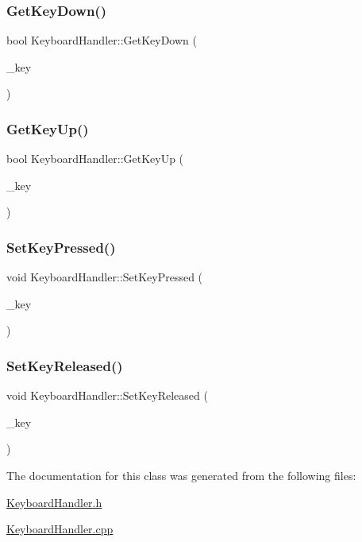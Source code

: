 \subsubsection{\texorpdfstring{Get\+Key\+Down()}{GetKeyDown()}}
{\footnotesize\ttfamily bool Keyboard\+Handler\+::\+Get\+Key\+Down (\begin{DoxyParamCaption}\item[{std\+::string}]{\+\_\+key }\end{DoxyParamCaption})}

\mbox{\label{class_keyboard_handler_ad184d06a6bf5d2d1db362e79a8073d98}} 
\subsubsection{\texorpdfstring{Get\+Key\+Up()}{GetKeyUp()}}
{\footnotesize\ttfamily bool Keyboard\+Handler\+::\+Get\+Key\+Up (\begin{DoxyParamCaption}\item[{std\+::string}]{\+\_\+key }\end{DoxyParamCaption})}

\mbox{\label{class_keyboard_handler_a166c8d62ec7c01cb155e7ba47007501a}} 
\subsubsection{\texorpdfstring{Set\+Key\+Pressed()}{SetKeyPressed()}}
{\footnotesize\ttfamily void Keyboard\+Handler\+::\+Set\+Key\+Pressed (\begin{DoxyParamCaption}\item[{S\+D\+L\+\_\+\+Keycode}]{\+\_\+key }\end{DoxyParamCaption})}

\mbox{\label{class_keyboard_handler_a696a4ddd0a75c79f220c424bd4bd1889}} 
\subsubsection{\texorpdfstring{Set\+Key\+Released()}{SetKeyReleased()}}
{\footnotesize\ttfamily void Keyboard\+Handler\+::\+Set\+Key\+Released (\begin{DoxyParamCaption}\item[{S\+D\+L\+\_\+\+Keycode}]{\+\_\+key }\end{DoxyParamCaption})}



The documentation for this class was generated from the following files\+:\begin{DoxyCompactItemize}
\item 
\mbox{\hyperlink{_keyboard_handler_8h}{Keyboard\+Handler.\+h}}\item 
\mbox{\hyperlink{_keyboard_handler_8cpp}{Keyboard\+Handler.\+cpp}}\end{DoxyCompactItemize}
